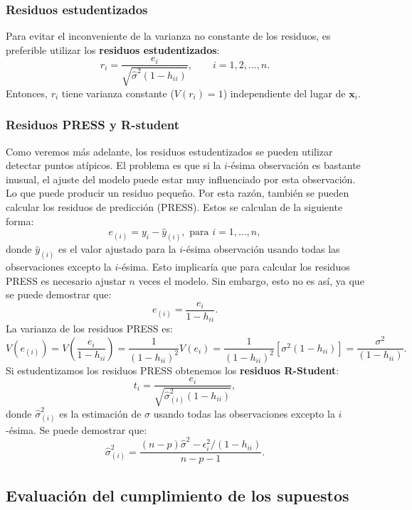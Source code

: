 \documentclass[
]{article}
\begin{document}
\hypertarget{residuos-estudentizados}{%
\subsubsection{Residuos estudentizados}\label{residuos-estudentizados}}

Para evitar el inconveniente de la varianza no constante de los residuos, es preferible utilizar los \textbf{residuos estudentizados}:
\[
r_{i} = \frac{e_{i}}{\sqrt{\hat{\sigma}^{2}(1-h_{ii})}}, \qquad i=1,2,\ldots,n.
\]
Entonces, \(r_{i}\) tiene varianza constante (\(V(r_{i})=1\)) independiente del lugar de \(\boldsymbol x_{i}\).

\hypertarget{residuos-press-y-r-student}{%
\subsubsection{Residuos PRESS y R-student}\label{residuos-press-y-r-student}}

Como veremos más adelante, los residuos estudentizados se pueden utilizar detectar puntos atípicos. El problema es que si la \(i\)-ésima observación es bastante inusual, el ajuste del modelo puede estar muy influenciado por esta observación. Lo que puede producir un residuo pequeño. Por esta razón, también se pueden calcular los residuos de predicción (PRESS). Estos se calculan de la siguiente forma:
\[
e_{(i)} = y_{i} - \widehat{y}_{(i)}, \mbox{ para }i=1,\ldots,n,
\]
donde \(\widehat{y}_{(i)}\) es el valor ajustado para la \(i\)-ésima observación usando todas las observaciones excepto la \(i\)-ésima. Esto implicaría que para calcular los residuos PRESS es necesario ajustar \(n\) veces el modelo. Sin embargo, esto no es así, ya que se puede demostrar que:
\[
e_{(i)} = \frac{e_{i}}{1-h_{ii}}.
\]
La varianza de los residuos PRESS es:
\[
V(e_{(i)}) = V\left( \frac{e_{i}}{1-h_{ii}} \right) = \frac{1}{(1-h_{ii})^{2}}V(e_{i}) = \frac{1}{(1-h_{ii})^{2}} [\sigma^{2}(1-h_{ii})] = \frac{\sigma^{2}}{(1-h_{ii})}.
\]
Si estudentizamos los residuos PRESS obtenemos los \textbf{residuos R-Student}:
\[
t_{i} = \frac{e_{i}}{\sqrt{\widehat{\sigma}^{2}_{(i)}(1-h_{ii})}},
\]
donde \(\widehat{\sigma}^{2}_{(i)}\) es la estimación de \(\sigma\) usando todas las observaciones excepto la \(i\)-ésima. Se puede demostrar que:
\[
\widehat{\sigma}^{2}_{(i)} = \frac{(n-p)\widehat{\sigma}^{2} - \epsilon^{2}_{i}/(1-h_{ii})}{n-p-1}.
\]

\hypertarget{evaluaciuxf3n-del-cumplimiento-de-los-supuestos}{%
\subsection{Evaluación del cumplimiento de los supuestos}\label{evaluaciuxf3n-del-cumplimiento-de-los-supuestos}}
\end{document}

